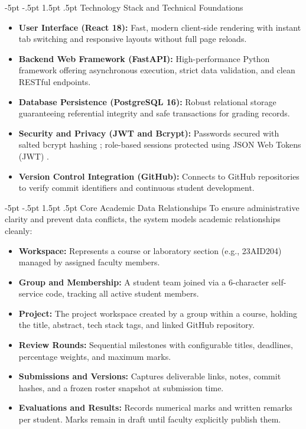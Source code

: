 \documentclass[11pt,a4paper]{article}
\makeatletter
\renewcommand\subsection{\@startsection{subsection}{2}{\z@}%
  {-5pt \@plus -1pt \@minus -.5pt}%
  {1.5pt \@plus .5pt}%
  {\normalfont\normalsize\bfseries\color{nexaSlate}}}
\makeatother
\begin{document}
\subsection{Technology Stack and Technical Foundations}
\begin{itemize}
  \setlength{\itemsep}{1pt}\setlength{\parskip}{0pt}
  \item \textbf{User Interface (React 18):} Fast, modern client-side rendering with instant tab switching and responsive layouts without full page reloads.
  \item \textbf{Backend Web Framework (FastAPI):} High-performance Python framework offering asynchronous execution, strict data validation, and clean RESTful endpoints.
  \item \textbf{Database Persistence (PostgreSQL 16):} Robust relational storage guaranteeing referential integrity and safe transactions for grading records.
  \item \textbf{Security and Privacy (JWT and Bcrypt):} Passwords secured with salted bcrypt hashing \cite{provos1999bcrypt}; role-based sessions protected using JSON Web Tokens (JWT) \cite{rfc7519jwt}.
  \item \textbf{Version Control Integration (GitHub):} Connects to GitHub repositories to verify commit identifiers and continuous student development.
\end{itemize}

\subsection{Core Academic Data Relationships}
To ensure administrative clarity and prevent data conflicts, the system models academic relationships cleanly:
\begin{itemize}
  \setlength{\itemsep}{1pt}\setlength{\parskip}{0pt}
  \item \textbf{Workspace:} Represents a course or laboratory section (e.g., 23AID204) managed by assigned faculty members.
  \item \textbf{Group and Membership:} A student team joined via a 6-character self-service code, tracking all active student members.
  \item \textbf{Project:} The project workspace created by a group within a course, holding the title, abstract, tech stack tags, and linked GitHub repository.
  \item \textbf{Review Rounds:} Sequential milestones with configurable titles, deadlines, percentage weights, and maximum marks.
  \item \textbf{Submissions and Versions:} Captures deliverable links, notes, commit hashes, and a frozen roster snapshot at submission time.
  \item \textbf{Evaluations and Results:} Records numerical marks and written remarks per student. Marks remain in draft until faculty explicitly publish them.
\end{itemize}
\end{document}

